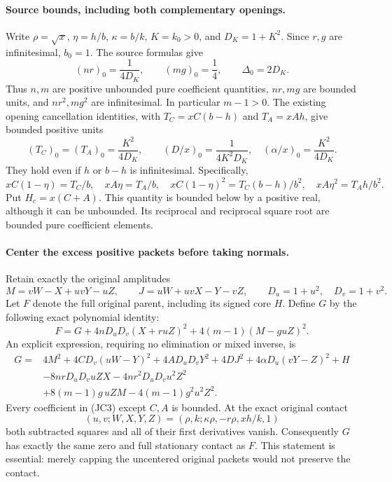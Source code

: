 \paragraph{Source bounds, including both complementary openings.}
Write $\rho=\sqrt{x}$, $\eta=h/b$, $\kappa=b/k$, $K=k_0>0$,
and $D_K=1+K^2$.  Since $r,g$ are infinitesimal, $b_0=1$.
The source formulas give
\[
 (nr)_0=\frac1{4D_K},\qquad (mg)_0=\frac14,
 \qquad \Delta_0=2D_K.
\]
Thus $n,m$ are positive unbounded pure coefficient quantities,
$nr,mg$ are bounded units, and $nr^2,mg^2$ are infinitesimal.
In particular $m-1>0$.  The existing opening cancellation identities,
with $T_C=xC(b-h)$ and $T_A=xAh$, give bounded positive units
\[
 (T_C)_0=(T_A)_0=\frac{K^2}{4D_K},\qquad
 (D/x)_0=\frac1{4K^2D_K},\quad
 (\alpha/x)_0=\frac{K^2}{4D_K}.
\]
They hold even if $h$ or $b-h$ is infinitesimal.  Specifically,
\[
 xC(1-\eta)=T_C/b,\quad xA\eta=T_A/b,\quad
 xC(1-\eta)^2=T_C(b-h)/b^2,\quad
 xA\eta^2=T_Ah/b^2.                                  \tag{JC1}
\]
Put $H_c=x(C+A)$.  This quantity is bounded below by a positive
real, although it can be unbounded.  Its reciprocal and reciprocal
square root are bounded pure coefficient elements.

\paragraph{Center the excess positive packets before taking normals.}
Retain exactly the original amplitudes
\[
 M=vW-X+uvY-uZ,\qquad J=uW+uvX-Y-vZ,
 \qquad D_u=1+u^2,\quad D_v=1+v^2.
\]
Let $F$ denote the full original parent, including its signed core
$H$.  Define $G$ by the following exact polynomial identity:
\[
 F=G+4nD_uD_v(X+ruZ)^2
             +4(m-1)(M-guZ)^2.                       \tag{JC2}
\]
An explicit expression, requiring no elimination or mixed inverse, is
\begin{align*}
G={}&4M^2+4CD_v(uW-Y)^2+4AD_uD_vY^2
       +4DJ^2+4\alpha D_u(vY-Z)^2+H\\
 &-8nrD_uD_vuZX-4nr^2D_uD_vu^2Z^2\\
 &+8(m-1)g\,uZM-4(m-1)g^2u^2Z^2.                  \tag{JC3}
\end{align*}
Every coefficient in (JC3) except $C,A$ is bounded.  At the exact
original contact
\[
 (u,v;W,X,Y,Z)=(\rho,k;\kappa\rho,-r\rho,xh/k,1)
\]
both subtracted squares and all of their first derivatives vanish.
Consequently $G$ has exactly the same zero and full stationary
contact as $F$.  This statement is essential: merely capping the
uncentered original packets would not preserve the contact.

